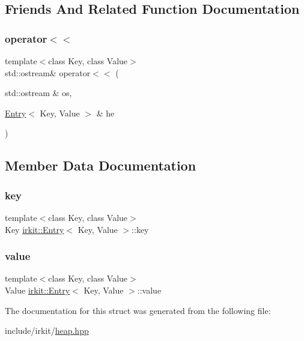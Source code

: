 \subsection{Friends And Related Function Documentation}
\mbox{\label{structirkit_1_1Entry_a885f1645de32df3dbfbf9f2f47f7ea1f}} 
\subsubsection{\texorpdfstring{operator$<$$<$}{operator<<}}
{\footnotesize\ttfamily template$<$class Key, class Value$>$ \\
std\+::ostream\& operator$<$$<$ (\begin{DoxyParamCaption}\item[{std\+::ostream \&}]{os,  }\item[{\mbox{\hyperlink{structirkit_1_1Entry}{Entry}}$<$ Key, Value $>$ \&}]{he }\end{DoxyParamCaption})\hspace{0.3cm}{\ttfamily [friend]}}



\subsection{Member Data Documentation}
\mbox{\label{structirkit_1_1Entry_aeae4387483b4905afd7dfd71df9104fc}} 
\subsubsection{\texorpdfstring{key}{key}}
{\footnotesize\ttfamily template$<$class Key, class Value$>$ \\
Key \mbox{\hyperlink{structirkit_1_1Entry}{irkit\+::\+Entry}}$<$ Key, Value $>$\+::key}

\mbox{\label{structirkit_1_1Entry_a72e5dd8efe13d360f7b97c37d05b99b8}} 
\subsubsection{\texorpdfstring{value}{value}}
{\footnotesize\ttfamily template$<$class Key, class Value$>$ \\
Value \mbox{\hyperlink{structirkit_1_1Entry}{irkit\+::\+Entry}}$<$ Key, Value $>$\+::value}



The documentation for this struct was generated from the following file\+:\begin{DoxyCompactItemize}
\item 
include/irkit/\mbox{\hyperlink{heap_8hpp}{heap.\+hpp}}\end{DoxyCompactItemize}
